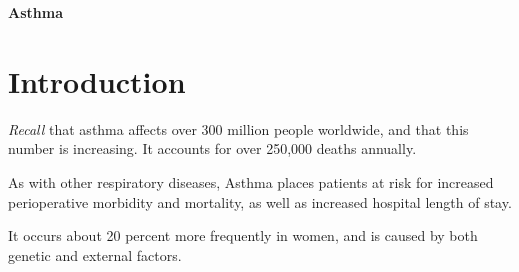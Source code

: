 \documentclass[11pt,letterpaper,draft]{exam}
\begin{document}
\setcounter{page}{1}
\setcounter{equation}{0}
\setcounter{figure}{0}
\begin{center}
\Large{\textbf{Asthma}}
\normalsize
\end{center}

\section*{Introduction}

\textit{Recall} that asthma affects over 300 million people worldwide, and that
this number is increasing. It accounts for over 250,000 deaths annually.

As with other respiratory diseases, Asthma places patients at risk for
increased perioperative morbidity and mortality, as well as increased hospital
length of stay.

It occurs about 20 percent more frequently in women, and is caused by both
genetic and external factors.
\end{document}
